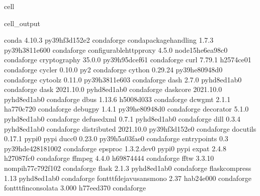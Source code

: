 \documentclass[letterpaper,table,10pt,english]{jupyterBook}
\begin{document}
\begin{sphinxuseclass}{cell}
\begin{sphinxVerbatimOutput}
\begin{sphinxuseclass}{cell_output}
\begin{sphinxVerbatim}[commandchars=\\\{\}]
conda                     4.10.3           py39hf3d152e\PYGZus{}2    conda\PYGZhy{}forge
conda\PYGZhy{}package\PYGZhy{}handling    1.7.3            py39h3811e60\PYGZus{}0    conda\PYGZhy{}forge
configurable\PYGZhy{}http\PYGZhy{}proxy   4.5.0           node15\PYGZus{}he6ea98c\PYGZus{}0    conda\PYGZhy{}forge
cryptography              35.0.0           py39h95dcef6\PYGZus{}1    conda\PYGZhy{}forge
curl                      7.79.1               h2574ce0\PYGZus{}1    conda\PYGZhy{}forge
cycler                    0.10.0                     py\PYGZus{}2    conda\PYGZhy{}forge
cython                    0.29.24          py39he80948d\PYGZus{}0    conda\PYGZhy{}forge
cytoolz                   0.11.0           py39h3811e60\PYGZus{}3    conda\PYGZhy{}forge
dash                      2.7.0              pyhd8ed1ab\PYGZus{}0    conda\PYGZhy{}forge
dask                      2021.10.0          pyhd8ed1ab\PYGZus{}0    conda\PYGZhy{}forge
dask\PYGZhy{}core                 2021.10.0          pyhd8ed1ab\PYGZus{}0    conda\PYGZhy{}forge
dbus                      1.13.6               h5008d03\PYGZus{}3    conda\PYGZhy{}forge
dcw\PYGZhy{}gmt                   2.1.1                ha770c72\PYGZus{}0    conda\PYGZhy{}forge
debugpy                   1.4.1            py39he80948d\PYGZus{}0    conda\PYGZhy{}forge
decorator                 5.1.0              pyhd8ed1ab\PYGZus{}0    conda\PYGZhy{}forge
defusedxml                0.7.1              pyhd8ed1ab\PYGZus{}0    conda\PYGZhy{}forge
dill                      0.3.4              pyhd8ed1ab\PYGZus{}0    conda\PYGZhy{}forge
distributed               2021.10.0        py39hf3d152e\PYGZus{}0    conda\PYGZhy{}forge
docutils                  0.17.1                   pypi\PYGZus{}0    pypi
ducc0                     0.23.0           py39h5a03fae\PYGZus{}0    conda\PYGZhy{}forge
entrypoints               0.3             py39hde42818\PYGZus{}1002    conda\PYGZhy{}forge
epsproc                   1.3.2.dev0               pypi\PYGZus{}0    pypi
expat                     2.4.8                h27087fc\PYGZus{}0    conda\PYGZhy{}forge
ffmpeg                    4.4.0                h6987444\PYGZus{}4    conda\PYGZhy{}forge
fftw                      3.3.10          nompi\PYGZus{}h77c792f\PYGZus{}102    conda\PYGZhy{}forge
flask                     2.1.3              pyhd8ed1ab\PYGZus{}0    conda\PYGZhy{}forge
flask\PYGZhy{}compress            1.13               pyhd8ed1ab\PYGZus{}0    conda\PYGZhy{}forge
font\PYGZhy{}ttf\PYGZhy{}dejavu\PYGZhy{}sans\PYGZhy{}mono 2.37                 hab24e00\PYGZus{}0    conda\PYGZhy{}forge
font\PYGZhy{}ttf\PYGZhy{}inconsolata      3.000                h77eed37\PYGZus{}0    conda\PYGZhy{}forge

\end{sphinxVerbatim}
\end{sphinxuseclass}
\end{sphinxVerbatimOutput}
\end{sphinxuseclass}
\end{document}
